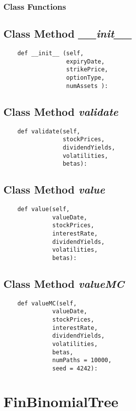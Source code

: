 \documentclass[twoside,11pt]{book}
\begin{document}
\subsubsection{Class Functions}

\subsection{Class Method {\it \_\_init\_\_ }}


\begin{lstlisting}
    def __init__ (self,
                  expiryDate,
                  strikePrice,
                  optionType,
                  numAssets ):
\end{lstlisting}

\subsection{Class Method {\it validate}}


\begin{lstlisting}
    def validate(self, 
                 stockPrices,
                 dividendYields,
                 volatilities, 
                 betas):
\end{lstlisting}

\subsection{Class Method {\it value}}


\begin{lstlisting}
    def value(self,
              valueDate,
              stockPrices,
              interestRate,
              dividendYields,
              volatilities, 
              betas):
\end{lstlisting}

\subsection{Class Method {\it valueMC}}


\begin{lstlisting}
    def valueMC(self,
              valueDate,
              stockPrices,
              interestRate,
              dividendYields,
              volatilities,
              betas,
              numPaths = 10000,
              seed = 4242):
\end{lstlisting}

\newpage
\section{FinBinomialTree}
\end{document}
